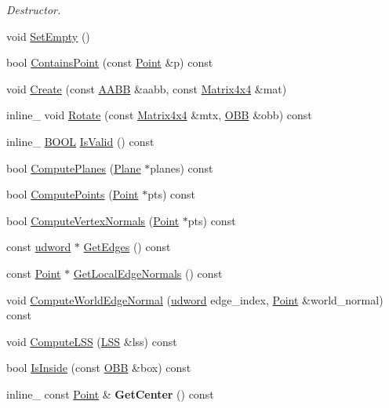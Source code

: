 \begin{DoxyCompactItemize}
\begin{DoxyCompactList}\small\item\em Destructor. \end{DoxyCompactList}\item 
void \hyperlink{classOBB_a942af8b1f9fda0544de062a071c75204}{Set\+Empty} ()
\item 
bool \hyperlink{classOBB_a509e791cfa67b4e168e33dc5db3674b8}{Contains\+Point} (const \hyperlink{classPoint}{Point} \&p) const 
\item 
void \hyperlink{classOBB_a86084565116d26baebe3ac3b7945000f}{Create} (const \hyperlink{classAABB}{A\+A\+BB} \&aabb, const \hyperlink{classMatrix4x4}{Matrix4x4} \&mat)
\item 
inline\+\_\+ void \hyperlink{classOBB_acf8fc783c04d70e3cdbc88a7a52d2eb0}{Rotate} (const \hyperlink{classMatrix4x4}{Matrix4x4} \&mtx, \hyperlink{classOBB}{O\+BB} \&obb) const 
\item 
inline\+\_\+ \hyperlink{IceTypes_8h_a050c65e107f0c828f856a231f4b4e788}{B\+O\+OL} \hyperlink{classOBB_a3bb702c4343f25d78dd7bec3a5359150}{Is\+Valid} () const 
\item 
bool \hyperlink{classOBB_a4edd7fb37a2ecd2334bcdcace3cdcd08}{Compute\+Planes} (\hyperlink{classPlane}{Plane} $\ast$planes) const 
\item 
bool \hyperlink{classOBB_ad9b5da33320f558b258c58726bcf4aed}{Compute\+Points} (\hyperlink{classPoint}{Point} $\ast$pts) const 
\item 
bool \hyperlink{classOBB_ac89ab861cbbfc1eb9a830d3dc6894d91}{Compute\+Vertex\+Normals} (\hyperlink{classPoint}{Point} $\ast$pts) const 
\item 
const \hyperlink{IceTypes_8h_a44c6f1920ba5551225fb534f9d1a1733}{udword} $\ast$ \hyperlink{classOBB_ae86fc2aec3e7f7e8ea721d71602dd1a0}{Get\+Edges} () const 
\item 
const \hyperlink{classPoint}{Point} $\ast$ \hyperlink{classOBB_ab14fe22b0a8573da44ea1c3828d79f0e}{Get\+Local\+Edge\+Normals} () const 
\item 
void \hyperlink{classOBB_a6e8844c4d4b064a2cfbd142589af22a2}{Compute\+World\+Edge\+Normal} (\hyperlink{IceTypes_8h_a44c6f1920ba5551225fb534f9d1a1733}{udword} edge\+\_\+index, \hyperlink{classPoint}{Point} \&world\+\_\+normal) const 
\item 
void \hyperlink{classOBB_ad94c92759c88eead1a8eab29896f6b6e}{Compute\+L\+SS} (\hyperlink{classLSS}{L\+SS} \&lss) const 
\item 
bool \hyperlink{classOBB_a8ba54f8335a9b5a4d18a98a0a0024dd7}{Is\+Inside} (const \hyperlink{classOBB}{O\+BB} \&box) const 
\item 
inline\+\_\+ const \hyperlink{classPoint}{Point} \& {\bfseries Get\+Center} () const \hypertarget{classOBB_a4d6d888b732b7764e58b73cba83e77f4}{}\label{classOBB_a4d6d888b732b7764e58b73cba83e77f4}


\end{DoxyCompactItemize}
